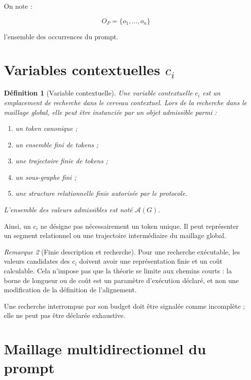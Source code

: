 \documentclass[11pt,a4paper,oneside]{book}
\newtheorem{definition}{Définition}[chapter]
\theoremstyle{remark}
\newtheorem{remarque}[definition]{Remarque}
\begin{document}
On note :

\[
O_P=\{o_1,\ldots,o_n\}
\]

l'ensemble des occurrences du prompt.

\section{Variables contextuelles \(c_i\)}

\begin{definition}[Variable contextuelle]
Une variable contextuelle \(c_i\) est un emplacement de recherche
dans le cerveau contextuel. Lors de la recherche dans le maillage
global, elle peut être instanciée par un objet admissible parmi :

\begin{enumerate}
  \item un token canonique ;
  \item un ensemble fini de tokens ;
  \item une trajectoire finie de tokens ;
  \item un sous-graphe fini ;
  \item une structure relationnelle finie autorisée par le protocole.
\end{enumerate}

L'ensemble des valeurs admissibles est noté \(\mathcal{A}(G)\).
\end{definition}

Ainsi, un \(c_i\) ne désigne pas nécessairement un token unique.
Il peut représenter un segment relationnel ou une trajectoire
intermédiaire du maillage global.

\begin{remarque}[Finie description et recherche]
Pour une recherche exécutable, les valeurs candidates des \(c_i\)
doivent avoir une représentation finie et un coût calculable.
Cela n'impose pas que la théorie se limite aux chemins courts :
la borne de longueur ou de coût est un paramètre d'exécution
déclaré, et non une modification de la définition de l'alignement.

Une recherche interrompue par son budget doit être signalée comme
incomplète ; elle ne peut pas être déclarée exhaustive.
\end{remarque}

\section{Maillage multidirectionnel du prompt}
\end{document}
